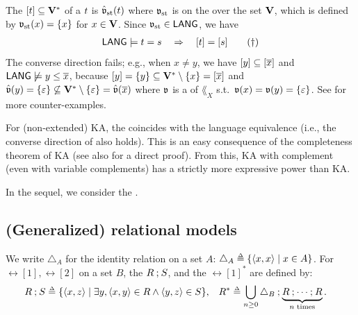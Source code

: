 The  $\ljump{\term} \subseteq \vsig^{\kstar}$ of a  $\term$ is $\hat{\val}_{\mathrm{st}}(\term)$ where $\mathfrak{v}_{\mathrm{st}}$ is  on the  over the set $\mathbf{V}$, which is defined by $\mathfrak{v}_{\mathrm{st}}(x) = \{x\}$ for $x \in \mathbf{V}$.
Since $\mathfrak{v}_{\mathrm{st}} \in \mathsf{LANG}$, we have
\begin{align*}
    \label{equation: LANG to lang} \LANG \models \term[1] = \term[2] \quad\Rightarrow\quad \ljump{\term[1]} = \ljump{\term[2]} \tag{$\dagger$}
\end{align*}
The converse direction fails; e.g., when $x \neq y$,
we have $[ y ] \subseteq [ \overline{x} ]$ and $\mathsf{LANG} \not\models y \le \overline{x}$,
because $[ y ] = \{y\} \subseteq \mathbf{V}^* \setminus \{x\} = [ \overline{x} ]$ and $\hat{\mathfrak{v}}(y) = \{\varepsilon\} \not\subseteq \mathbf{V}^* \setminus \{\varepsilon\} = \hat{\mathfrak{v}}(\overline{x})$ where $\mathfrak{v}$ is a  of $\lang_{X}$ s.t.\ $\mathfrak{v}(x) = \mathfrak{v}(y) = \{\varepsilon\}$.
See \cite{nakamuraWordstoLettersValuationsLanguage2023} for more counter-examples.
\begin{remark}\label{remark: KA completeness}
    For (non-extended) KA, the  coincides with the language equivalence \cite{kozenCompletenessTheoremKleene1991, andrekaEquationalTheoryKleene2011} (i.e., the converse direction of  also holds).
    This is an easy consequence of the completeness theorem of KA \cite{kozenCompletenessTheoremKleene1991} (see also \cite[Appendix A]{nakamuraWordstoLettersValuationsLanguage2023} for a direct proof).
    From this, KA with complement (even with variable complements) has a strictly more expressive power than KA.
\end{remark}
In the sequel, we consider the .

\subsection{(Generalized) relational models}
We write $\triangle_{A}$ for the identity relation on a set $A$: $\triangle_{A} \defeq \set{\tuple{x, x} \mid x \in A}$.
For  $\rel[1], \rel[2]$ on a set $B$, the \intro*{} $\rel[1] \rcompo \rel[2]$,
and the \intro*{} $\rel[1]^*$ are defined by:
\begin{align*}
    \rel[1] \rcompo \rel[2] & \defeq \set{\tuple{x, z} \mid \exists y, \tuple{x, y} \in \rel[1] \land \tuple{y, z} \in \rel[2]}, &
    \rel[1]^* & \defeq \bigcup_{n \ge 0} \triangle_{B} \compo \underbrace{\rel[1] \compo \dots \compo \rel[1]}_{n \text{ times}}.
\end{align*}

